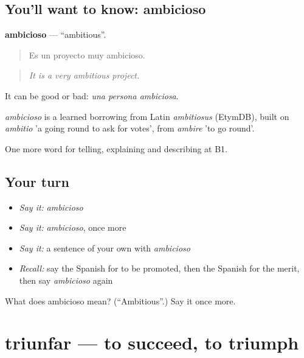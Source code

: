 \subsection*{You'll want to know: ambicioso}
\textbf{ambicioso} — \textquotedblleft{}ambitious\textquotedblright{}.

\begin{quote}
Es un proyecto muy ambicioso.
\end{quote}

\begin{quote}
\emph{It is a very ambitious project.}
\end{quote}

It can be good or bad: \emph{una persona ambiciosa}.

\begin{cousinweb}
\emph{ambicioso} is a learned borrowing from Latin \emph{ambitiosus} (EtymDB), built on \emph{ambitio} 'a going round to ask for votes', from \emph{ambire} 'to go round'.
\end{cousinweb}

\begin{grammarlens}[title={What you've built}]
One more word for telling, explaining and describing at B1.
\end{grammarlens}

\subsection*{Your turn}
\begin{itemize}
\raggedright
  \item \emph{Say it:} \emph{ambicioso}
  \item \emph{Say it:} \emph{ambicioso}, once more
  \item \emph{Say it:} a sentence of your own with \emph{ambicioso}
  \item \emph{Recall:} say the Spanish for to be promoted, then the Spanish for the merit, then say \emph{ambicioso} again
\end{itemize}

\begin{tcolorbox}[breakable,colback=teal!4,colframe=teal!35!black,title={Before you move on}]
What does ambicioso mean? (\textquotedblleft{}Ambitious\textquotedblright{}.) Say it once more.
\end{tcolorbox}
\section[triunfar]{triunfar — to succeed, to triumph}

